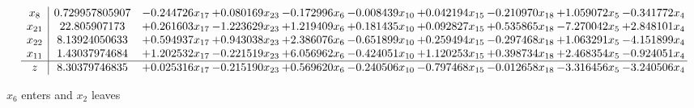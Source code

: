 \documentclass[10pt]{article}
\begin{document}
\[\begin{array}{c| c c@{\hskip 2pt} c@{\hskip 2pt} c@{\hskip 2pt} c@{\hskip 2pt} c@{\hskip 2pt} c@{\hskip 2pt} c@{\hskip 2pt} c@{\hskip 2pt} }
 x_{8}   &  0.729957805907 & -0.244726 x_{17} & + 0.080169 x_{23} & -0.172996 x_{6} & -0.008439 x_{10} & + 0.042194 x_{15} & -0.210970 x_{18} & + 1.059072 x_{5} & -0.341772 x_{4}\\
 x_{21}   &  22.805907173 & + 0.261603 x_{17} & -1.223629 x_{23} & + 1.219409 x_{6} & + 0.181435 x_{10} & + 0.092827 x_{15} & + 0.535865 x_{18} & -7.270042 x_{5} & + 2.848101 x_{4}\\
 x_{22}   &  8.13924050633 & + 0.594937 x_{17} & + 0.943038 x_{23} & + 2.386076 x_{6} & -0.651899 x_{10} & + 0.259494 x_{15} & -0.297468 x_{18} & + 1.063291 x_{5} & -4.151899 x_{4}\\
 x_{11}   &  1.43037974684 & + 1.202532 x_{17} & -0.221519 x_{23} & + 6.056962 x_{6} & -0.424051 x_{10} & + 1.120253 x_{15} & + 0.398734 x_{18} & + 2.468354 x_{5} & -0.924051 x_{4}\\
\hline
z    &  8.30379746835 & + 0.025316 x_{17} & -0.215190 x_{23} & + 0.569620 x_{6} & -0.240506 x_{10} & -0.797468 x_{15} & -0.012658 x_{18} & -3.316456 x_{5} & -3.240506 x_{4}\\
\end{array}\]


 $ x_{6} $ enters and $ x_{2} $ leaves 
\end{document}
